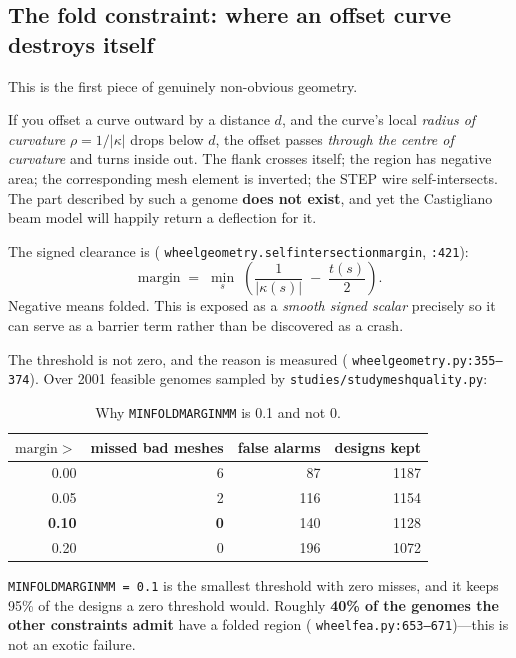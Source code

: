 \documentclass[11pt,a4paper]{article}
\DeclareRobustCommand{\code}[1]{%
  \texttt{\small\def\_{\textunderscore\discretionary{}{}{}}#1}}
\newcommand{\at}[2]{\code{#1:#2}}
\begin{document}
\subsection{The fold constraint: where an offset curve destroys itself}
\label{sec:fold}

This is the first piece of genuinely non-obvious geometry.

If you offset a curve outward by a distance $d$, and the curve's local \emph{radius of
curvature} $\rho = 1/|\kappa|$ drops below $d$, the offset passes \emph{through the
centre of curvature} and turns inside out. The flank crosses itself; the region has
negative area; the corresponding mesh element is inverted; the STEP wire
self-intersects. The part described by such a genome \textbf{does not exist}, and yet
the Castigliano beam model will happily return a deflection for it.

The signed clearance is (\code{wheel\_geometry.self\_intersection\_margin},
\code{:421}):
%
\begin{equation}
  \mathrm{margin} \;=\; \min_{s}\;\left(\frac{1}{|\kappa(s)|} \;-\; \frac{t(s)}{2}\right).
  \label{eq:foldmargin}
\end{equation}
%
Negative means folded. This is exposed as a \emph{smooth signed scalar} precisely so it
can serve as a barrier term rather than be discovered as a crash.

The threshold is not zero, and the reason is measured
(\at{wheel\_geometry.py}{355--374}). Over 2001 feasible genomes sampled by
\code{studies/study\_mesh\_quality.py}:

\begin{table}[h]
\centering
\small
\begin{tabular}{@{}rrrr@{}}
\toprule
$\mathrm{margin} >$ & missed bad meshes & false alarms & designs kept \\
\midrule
0.00 & 6 & 87 & 1187 \\
0.05 & 2 & 116 & 1154 \\
\textbf{0.10} & \textbf{0} & 140 & 1128 \\
0.20 & 0 & 196 & 1072 \\
\bottomrule
\end{tabular}
\caption{Why \code{MIN\_FOLD\_MARGIN\_MM} is 0.1 and not 0.}
\end{table}

\code{MIN\_FOLD\_MARGIN\_MM = 0.1} is the smallest threshold with zero misses, and it
keeps 95\% of the designs a zero threshold would. Roughly \textbf{40\% of the genomes
the other constraints admit} have a folded region (\at{wheel\_fea.py}{653--671})---this
is not an exotic failure.
\end{document}
